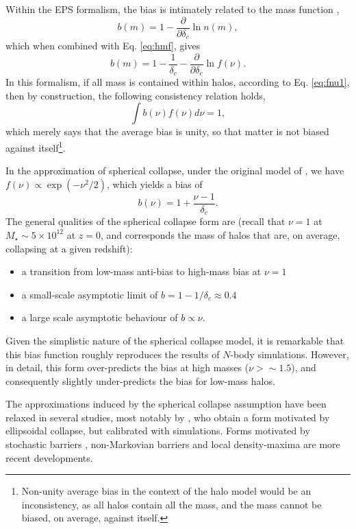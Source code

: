 \documentclass[5p]{elsarticle}
\begin{document}
Within the EPS formalism, the bias is intimately related to the mass function \citep{Cole1989,Cooray2002}, 
\begin{equation}
    b(m) = 1 - \frac{\partial}{\partial \delta_c} \ln n(m),
\end{equation}
which when combined with Eq. \ref{eq:hmf}, gives
\begin{equation}
    b(m) = 1 - \frac{1}{\delta_c} - \frac{\partial}{\partial \delta_c} \ln f(\nu).
\end{equation}
In this formalism, if all mass is contained within halos, according to Eq. \ref{eq:fnu1}, then by construction, the following consistency relation holds,
\begin{equation}
\label{eq:consistency}
    \int b(\nu) f(\nu) d\nu = 1, 
\end{equation}
which merely says that the average bias is unity, so that matter is not biased against itself\footnote{Non-unity average bias in the context of the halo model would be an inconsistency, as all halos contain all the mass, and the mass cannot be biased, on average, against itself.}. 

In the approximation of spherical collapse, under the original model of \citep{Press1974}, we have $f(\nu) \propto \exp(-\nu^2/2)$, which yields a bias of  \citep{Cole1989,Mo1996}
\begin{equation}
    b(\nu) = 1+ \frac{\nu -1}{\delta_c}.
\end{equation}
The general qualities of the spherical collapse form are (recall that $\nu = 1$ at $M_\star \sim 5\times10^{12}$ at $z=0$, and corresponds the mass of halos that are, on average, collapsing at a given redshift): 
\begin{itemize}
    \item  a transition from low-mass anti-bias to high-mass bias at $\nu = 1$
    \item a small-scale asymptotic limit of $b = 1 - 1/\delta_c \approx 0.4$
    \item a large scale asymptotic behaviour of $b \propto \nu$. 
\end{itemize}

Given the simplistic nature of the spherical collapse model, it is remarkable that this bias function roughly reproduces the results of $N$-body simulations. However, in detail, this form over-predicts the bias at high masses ($\nu >\sim1.5$), and consequently slightly under-predicts the bias for low-mass halos. 

The approximations induced by the spherical collapse assumption have been relaxed in several studies, most notably by \citet{Sheth2001}, who obtain a form motivated by ellipsoidal collapse, but calibrated with simulations. Forms motivated by stochastic barriers \citep{Corasaniti2011}, non-Markovian barriers \citep{Ma2011} and local density-maxima \citep{Paranjape2013a} are more recent developments.
\end{document}
